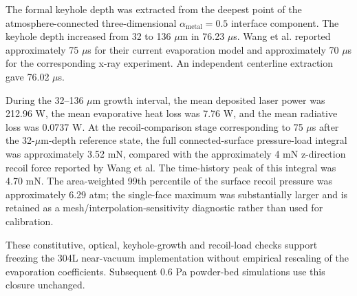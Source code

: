 The formal keyhole depth was extracted from the deepest point of the
atmosphere-connected three-dimensional
$\alpha_{\mathrm{metal}}=0.5$ interface component. The keyhole depth increased
from 32 to 136 $\mu$m in 76.23 $\mu$s. Wang et al. reported approximately
75 $\mu$s for their current evaporation model and approximately 70 $\mu$s
for the corresponding x-ray experiment. An independent centerline extraction
gave 76.02 $\mu$s.

During the 32--136 $\mu$m growth interval, the mean deposited laser power was
212.96 W, the mean evaporative heat loss was 7.76 W, and the mean radiative
loss was 0.0737 W. At the recoil-comparison stage corresponding to 75 $\mu$s
after the 32-$\mu$m-depth reference state, the full connected-surface
pressure-load integral was approximately 3.52 mN, compared with the
approximately 4 mN z-direction recoil force reported by Wang et al. The
time-history peak of this integral was 4.70 mN. The area-weighted 99th
percentile of the surface recoil pressure was approximately 6.29 atm; the
single-face maximum was substantially larger and is retained as a
mesh/interpolation-sensitivity diagnostic rather than used for calibration.

These constitutive, optical, keyhole-growth and recoil-load checks support
freezing the 304L near-vacuum implementation without empirical rescaling of
the evaporation coefficients. Subsequent 0.6 Pa powder-bed simulations use
this closure unchanged.
